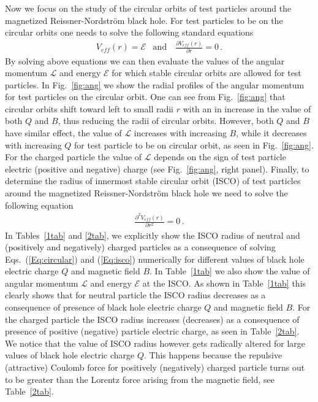 \documentclass[showpacs,twocolumn,superscriptaddress]{revtex4}
\begin{document}
Now we focus on the study of the circular orbits of test particles around the magnetized Reissner-Nordstr\"{o}m black hole.  For test particles to be on the circular orbits one needs to solve the following standard equations
%
\begin{eqnarray}\label{Eq:circular}
V_{eff}(r)=\mathcal{E}\,  \mbox{~~and ~~}  \frac{\partial V_{eff}(r)}{\partial r}=0\, .
\label{Eq:cir2}
\end{eqnarray}
%
By solving above equations we can then evaluate the values of the angular momentum $\mathcal{L}$ and energy $\mathcal{E}$ for which stable circular orbits are allowed for test particles. In Fig.~\ref{fig:ang}
we show the radial profiles of the angular momentum for test particles on the circular orbit. One can see from Fig.~\ref{fig:ang} that circular orbits shift toward left to small radii $r$ with an in increase in the value of both $Q$ and $B$, thus reducing the radii of circular orbits. However, both $Q$ and $B$ have similar effect, the value of $\mathcal{L}$ increases with increasing $B$, while it decreases with increasing $Q$ for test particle to be on circular orbit, as seen in Fig.~\ref{fig:ang}. For the charged particle the value of $\mathcal L$ depends on the sign of test particle electric (positive and negative) charge (see Fig.~\ref{fig:ang}, right panel). Finally, to determine the radius of innermost stable circular orbit (ISCO) of test particles around the magnetized Reissner-Nordstr\"{o}m black hole we need to solve the following equation 
%
\begin{eqnarray}\label{Eq:isco}
\frac{\partial^2 V_{eff}(r)}{\partial r^2}=0\, .
\end{eqnarray}
%
In Tables~\ref{1tab} and \ref{2tab}, we explicitly show the ISCO radius of neutral and (positively and negatively) charged particles as a consequence of solving Eqs.~(\ref{Eq:circular}) and (\ref{Eq:isco}) numerically for different values of black hole electric charge $Q$ and magnetic field $B$. In Table~\ref{1tab} we also show the value of angular momentum $\mathcal{L}$ and energy $\mathcal{E}$ at the ISCO.  As shown in Table~\ref{1tab} this clearly shows that for neutral particle the ISCO radius decreases as a consequence of presence of black hole electric charge $Q$ and magnetic field $B$. For the charged particle the ISCO radius increases (decreases) as a consequence of presence of positive (negative) particle electric charge, as seen in Table~\ref{2tab}.  We notice that the value of ISCO radius however gets radically altered for large values of black hole electric charge $Q$. This happens because the repulsive (attractive) Coulomb force for positively (negatively) charged particle turns out to be greater than the Lorentz force arising from the magnetic field, see Table~\ref{2tab}.
\end{document}
